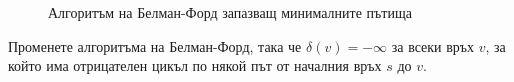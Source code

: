 \begin{figure}[!htbp]
  
  \caption{Алгоритъм на Белман-Форд запазващ минималните пътища}
  \label{fig:bellman-ford-graph}
\end{figure}


\begin{problem}
  Променете алгоритъма на Белман-Форд, така че $\delta(v) = -\infty$ за всеки връх $v$, 
  за който има отрицателен цикъл по някой път от началния връх $s$ до $v$.
\end{problem}



